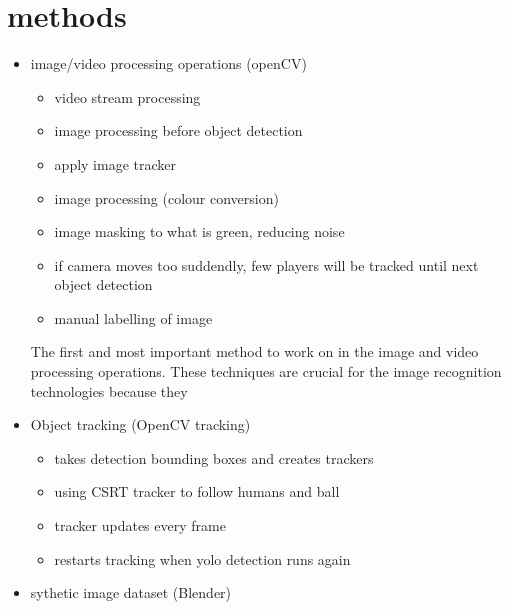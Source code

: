 \documentclass[
11pt,
twoside
]{report}
\begin{document}
\section{methods}

\begin{itemize}
\item
  image/video processing operations (openCV)

  \begin{itemize}
  \item
    video stream processing

  \item
    image processing before object detection

  \item
    apply image tracker

  \item
    image processing (colour conversion)
  \item
    image masking to what is green, reducing noise

  \item
    if camera moves too suddendly, few players will be tracked until next object detection
  \item
    manual labelling of image
  \end{itemize}


The first and most important method to work on in the image and video processing operations. These techniques are crucial for the image recognition technologies because they

\item
  Object tracking (OpenCV tracking)

  \begin{itemize}
  \item
    takes detection bounding boxes and creates trackers
  \item
    using CSRT tracker to follow humans and ball
  \item
    tracker updates every frame
  \item
    restarts tracking when yolo detection runs again
  \end{itemize}

\item
  sythetic image dataset (Blender)


\end{itemize}
\end{document}
